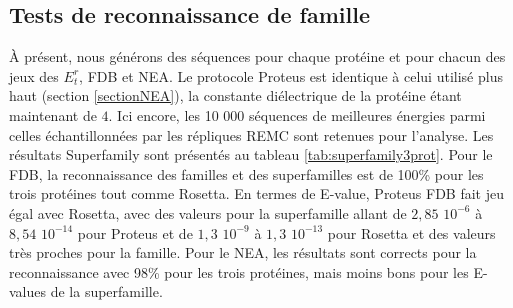     
\subsection{Tests de reconnaissance de famille}
À présent, nous générons des séquences pour chaque protéine et pour chacun des jeux des $E_t^r$, FDB et NEA. Le protocole Proteus est identique à celui utilisé plus haut (section \ref{sectionNEA}), la constante diélectrique de la protéine étant maintenant de $4$. Ici encore, les 10 000 séquences de meilleures énergies parmi celles échantillonnées par les répliques REMC sont retenues pour l'analyse. Les résultats Superfamily sont présentés au tableau \ref{tab:superfamily3prot}. Pour le FDB, la reconnaissance des familles et des superfamilles est de 100\% pour les trois protéines tout comme Rosetta. En termes de E-value, Proteus FDB fait jeu égal avec Rosetta, avec des valeurs pour la superfamille allant de $2,85$ $10^{-6}$ à $8,54$ $10^{-14}$ pour Proteus et de $1,3$ $10^{-9}$ à $1,3$ $10^{-13}$ pour Rosetta et des valeurs très proches pour la famille. Pour le NEA, les résultats sont corrects pour la reconnaissance avec 98\% pour les trois protéines, mais moins bons pour les E-values de la superfamille. 


